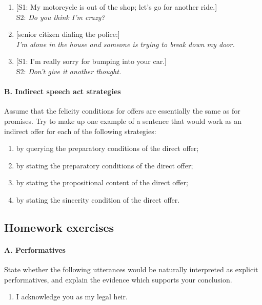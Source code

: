 \begin{enumerate}
\item{} [S1: My motorcycle is out of the shop; let’s go for another ride.]\\
S2: \textit{Do you think I’m crazy?}
\item{} [senior citizen dialing the police:]\\
\textit{I’m alone in the house and someone is trying to break down my door.}
\item{} [S1: I’m really sorry for bumping into your car.]\\
S2: \textit{Don’t give it another thought.}
\end{enumerate}
\paragraph{B. Indirect speech act strategies}

Assume that the felicity conditions for offers are essentially the same as for promises. Try to make up one example of a sentence that would work as an indirect offer for each of the following strategies:

\begin{enumerate}
\item by querying the preparatory conditions of the direct offer;
\item by stating the preparatory conditions of the direct offer;
\item by stating the propositional content of the direct offer;
\item by stating the sincerity condition of the direct offer.
\end{enumerate}
\subsection*{Homework exercises}\footnotemark{} %
\paragraph{A. Performatives}

State whether the following utterances would be naturally interpreted as explicit performatives, and explain the evidence which supports your conclusion.

\begin{enumerate}
\item \rmfamily
I acknowledge you as my legal heir.
\end{enumerate}

